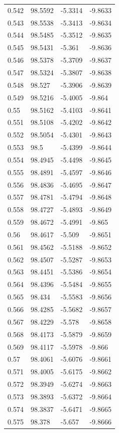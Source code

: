 \begin{tabular}{llll}
0.542 & 98.5592 & -5.3314 & -9.8633 \\
0.543 & 98.5538 & -5.3413 & -9.8634 \\
0.544 & 98.5485 & -5.3512 & -9.8635 \\
0.545 & 98.5431 & -5.361 & -9.8636 \\
0.546 & 98.5378 & -5.3709 & -9.8637 \\
0.547 & 98.5324 & -5.3807 & -9.8638 \\
0.548 & 98.527 & -5.3906 & -9.8639 \\
0.549 & 98.5216 & -5.4005 & -9.864 \\
0.55 & 98.5162 & -5.4103 & -9.8641 \\
0.551 & 98.5108 & -5.4202 & -9.8642 \\
0.552 & 98.5054 & -5.4301 & -9.8643 \\
0.553 & 98.5 & -5.4399 & -9.8644 \\
0.554 & 98.4945 & -5.4498 & -9.8645 \\
0.555 & 98.4891 & -5.4597 & -9.8646 \\
0.556 & 98.4836 & -5.4695 & -9.8647 \\
0.557 & 98.4781 & -5.4794 & -9.8648 \\
0.558 & 98.4727 & -5.4893 & -9.8649 \\
0.559 & 98.4672 & -5.4991 & -9.865 \\
0.56 & 98.4617 & -5.509 & -9.8651 \\
0.561 & 98.4562 & -5.5188 & -9.8652 \\
0.562 & 98.4507 & -5.5287 & -9.8653 \\
0.563 & 98.4451 & -5.5386 & -9.8654 \\
0.564 & 98.4396 & -5.5484 & -9.8655 \\
0.565 & 98.434 & -5.5583 & -9.8656 \\
0.566 & 98.4285 & -5.5682 & -9.8657 \\
0.567 & 98.4229 & -5.578 & -9.8658 \\
0.568 & 98.4173 & -5.5879 & -9.8659 \\
0.569 & 98.4117 & -5.5978 & -9.866 \\
0.57 & 98.4061 & -5.6076 & -9.8661 \\
0.571 & 98.4005 & -5.6175 & -9.8662 \\
0.572 & 98.3949 & -5.6274 & -9.8663 \\
0.573 & 98.3893 & -5.6372 & -9.8664 \\
0.574 & 98.3837 & -5.6471 & -9.8665 \\
0.575 & 98.378 & -5.657 & -9.8666 \\

\end{tabular}

